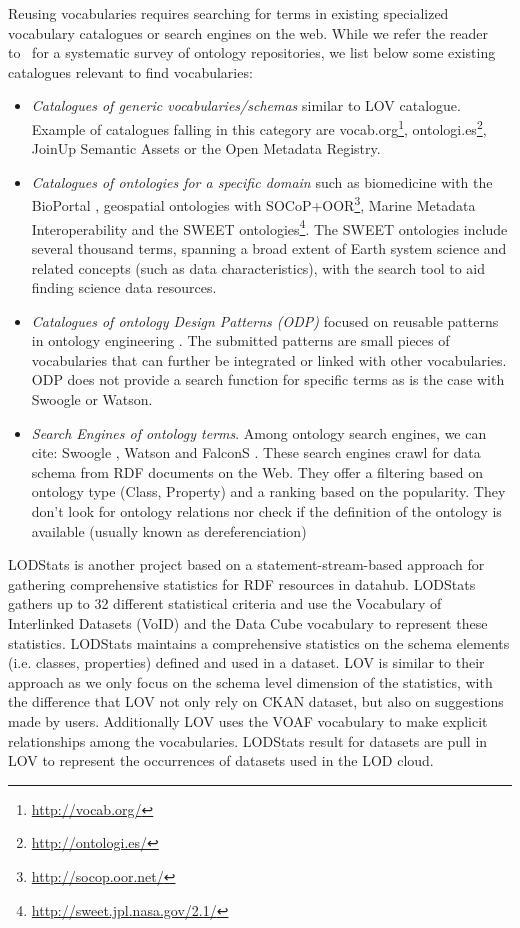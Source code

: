 \documentclass{iosart2c}
\begin{document}
Reusing vocabularies requires searching for terms in existing specialized vocabulary catalogues or search engines on the web. While we refer the reader to~\cite{AquinJoWS12} for a systematic survey of ontology repositories, we list below some existing catalogues relevant to find vocabularies:
\begin{itemize}
 \item \textit{Catalogues of generic vocabularies/schemas} similar to LOV catalogue. Example of catalogues falling in this category are vocab.org\footnote{\url{http://vocab.org/}}, ontologi.es\footnote{\url{http://ontologi.es/}}, JoinUp Semantic Assets or the Open Metadata Registry.
 \item \textit{Catalogues of ontologies for a specific domain} such as biomedicine with the BioPortal \cite{bioportal11}, geospatial ontologies with SOCoP+OOR\footnote{\url{http://socop.oor.net/}}, Marine Metadata Interoperability and the SWEET \cite{sweet05} ontologies\footnote{\url{http://sweet.jpl.nasa.gov/2.1/}}. The SWEET ontologies include several thousand terms, spanning a broad extent of Earth system science and related concepts (such as data characteristics), with the search tool to aid finding science data resources. 
 \item \textit{Catalogues of ontology Design Patterns (ODP)} focused on reusable patterns in ontology engineering \cite{presutti08}. The submitted patterns are small pieces of vocabularies that can further be integrated or linked with other vocabularies. ODP does not provide a search function for specific terms as is the case with Swoogle or Watson.
 \item \textit{Search Engines of ontology terms}. Among ontology search engines, we can cite: Swoogle \cite{finin2005swoogle}, Watson \cite{d2007watson,Sabou07} and FalconS \cite{cheng2008falcons}. These search engines crawl for data schema from RDF documents on the Web. They offer a filtering based on ontology type (Class, Property) and a ranking based on the popularity. They don't look for ontology relations nor check if the definition of the ontology is available (usually known as dereferenciation)
\end{itemize}

LODStats \cite{demter-2012-ekaw} is another project based on a statement-stream-based approach
for gathering comprehensive statistics for RDF resources in datahub. LODStats gathers up to 32 different statistical criteria and use the Vocabulary of Interlinked Datasets (VoID)\cite{void2009} and the Data Cube vocabulary to represent these statistics. LODStats maintains a comprehensive statistics on the schema elements (i.e. classes, properties) defined and used in a dataset. LOV is similar to their approach as we only focus on the schema level dimension of the statistics, with the difference that LOV not only rely on CKAN dataset, but also on suggestions made by users. Additionally LOV uses the VOAF vocabulary to make explicit relationships among the vocabularies. LODStats result for datasets are pull in LOV to represent the occurrences of datasets used in the LOD cloud. 
\end{document}

